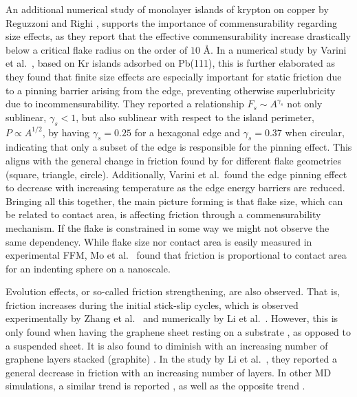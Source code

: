 An additional numerical study of monolayer islands of krypton on copper by
Reguzzoni and Righi \cite{PhysRevB.85.201412}, supports the importance of
commensurability regarding size effects, as they report that the effective
commensurability increase drastically below a critical flake radius on the order
of $10$ Å. In a numerical study by Varini et al.\ \cite{Varini_2015}, based on
Kr islands adsorbed on Pb(111), this is further elaborated as they found that
finite size effects are especially important for static friction due to a
pinning barrier arising from the edge, preventing otherwise superlubricity due
to incommensurability. They reported a relationship $F_s \sim A^{\gamma_s}$ not
only sublinear, $\gamma_s < 1$, but also sublinear with respect to the island
perimeter, $P \propto A^{1/2}$, by having $\gamma_s = 0.25$ for a hexagonal edge
and $\gamma_s = 0.37$ when circular, indicating that only a subset of the edge
is responsible for the pinning effect. This aligns with the general change in
friction found by \cite{zhu_study_2018} for different flake geometries (square,
triangle, circle). Additionally, Varini et al.\ found the edge pinning effect to
decrease with increasing temperature as the edge energy barriers are reduced.
Bringing all this together, the main picture forming is that flake size, which
can be related to contact area, is affecting friction through a commensurability
mechanism. If the flake is constrained in some way we might not observe the same
dependency. While flake size nor contact area is easily measured in experimental
\acrshort{FFM}, Mo et al.\ \cite{mo_friction_2009} found that friction is
proportional to contact area for an indenting sphere on a nanoscale.

Evolution effects, or so-called friction strengthening, are also observed. That
is, friction increases during the initial stick-slip cycles, which is observed
experimentally by Zhang et al.\ \cite{zhang_tuning_2019} and numerically by Li
et al.\ \cite{li_evolving_2016}. However, this is only found when having the
graphene sheet resting on a substrate \cite{zhang_tuning_2019}, as opposed to a
suspended sheet. It is also found to diminish with an increasing number of
graphene layers stacked (graphite) \cite{li_evolving_2016}. In the study by Li
et al.\ , they reported a general decrease in friction with an increasing number of layers. In other \acrshort{MD} simulations, a similar trend is reported
\cite{Yoon2015MolecularDS}, as well as the opposite trend \cite{Reguzzoni_2012}.


